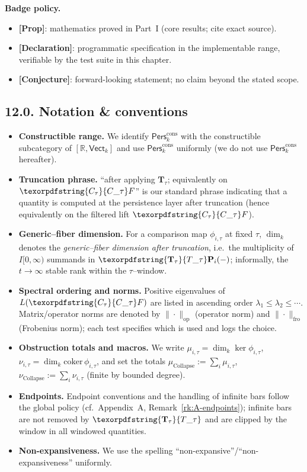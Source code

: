 \documentclass[11pt]{article}
\numberwithin{equation}{section}
\theoremstyle{plain}
\theoremstyle{definition}
\theoremstyle{remark}
\DeclareRobustCommand{\hyp}{\nobreakdash-}
\newcommand{\Pers}{\mathsf{Pers}}
\theoremstyle{plain}
\theoremstyle{definition}
\numberwithin{equation}{section}
\theoremstyle{definition}
\DeclareRobustCommand{\Perskft}{\Pers^{\mathrm{cons}}_{k}}
\DeclareRobustCommand{\Ttau}{\texorpdfstring{\ensuremath{\mathbf{T}_{\tau}}}{T\_\tau}}
\DeclareRobustCommand{\Ctau}{\texorpdfstring{\ensuremath{C_{\tau}}}{C\_\tau}}
\DeclareRobustCommand{\muc}{\mu_{\mathrm{Collapse}}}
\DeclareRobustCommand{\nuc}{\nu_{\mathrm{Collapse}}}
\numberwithin{equation}{section}
\theoremstyle{plain}
\theoremstyle{definition}
\theoremstyle{remark}
\providecommand{\Cfun}[1]{\mathsf{C}_{#1}}
\providecommand{\Tfun}[1]{\mathbf{T}_{#1}}
\providecommand{\Ctau}{\Cfun{\tau}}
\providecommand{\Ttau}{\Tfun{\tau}}
\providecommand{\muc}{\mu_{\mathrm{Collapse}}}
\providecommand{\nuc}{\nu_{\mathrm{Collapse}}}
\begin{document}
\noindent\textbf{Badge policy.}
\begin{itemize}
  \item \textbf{[Prop]}: mathematics proved in Part~I (core results; cite exact source).
  \item \textbf{[Declaration]}: programmatic specification in the implementable range, verifiable by the test suite in this chapter.
  \item \textbf{[Conjecture]}: forward-looking statement; no claim beyond the stated scope.
\end{itemize}

\subsection*{12.0. Notation \& conventions}
\begin{itemize}
  \item \textbf{Constructible range.} We identify \(\Perskft\) with the constructible subcategory of \([\mathbb{R},\mathsf{Vect}_k]\) and use \(\Perskft\) uniformly (we do not use \(\Pers^{\mathrm{cons}}_k\) hereafter).
  \item \textbf{Truncation phrase.} “after applying \(\mathbf{T}_\tau\); equivalently on \(\Ctau F\)” is our standard phrase indicating that a quantity is computed at the persistence layer after truncation (hence equivalently on the filtered lift \(\Ctau F\)).
  \item \textbf{Generic–fiber dimension.} For a comparison map \(\phi_{i,\tau}\) at fixed \(\tau\), \(\dim_k\) denotes the \emph{generic–fiber dimension after truncation}, i.e.\ the multiplicity of \(I[0,\infty)\) summands in \(\Ttau\mathbf{P}_i(-)\); informally, the \(t\to\infty\) stable rank within the \(\tau\)–window.
  \item \textbf{Spectral ordering and norms.} Positive eigenvalues of \(L(\Ctau F)\) are listed in ascending order \(\lambda_1\le \lambda_2\le\cdots\). Matrix/operator norms are denoted by \(\|\cdot\|_{\mathrm{op}}\) (operator norm) and \(\|\cdot\|_{\mathrm{fro}}\) (Frobenius norm); each test specifies which is used and logs the choice.
  \item \textbf{Obstruction totals and macros.} We write \(\mu_{i,\tau}=\dim_k\ker\phi_{i,\tau}\), \(\nu_{i,\tau}=\dim_k\mathrm{coker}\,\phi_{i,\tau}\), and set the totals \(\muc:=\sum_i\mu_{i,\tau}\), \(\nuc:=\sum_i\nu_{i,\tau}\) (finite by bounded degree).
  \item \textbf{Endpoints.} Endpoint conventions and the handling of infinite bars follow the global policy (cf.\ Appendix~A, Remark~\ref{rk:A-endpoints}); infinite bars are not removed by \(\Ttau\) and are clipped by the window in all windowed quantities.
  \item \textbf{Non\hyp expansiveness.} We use the spelling “non\hyp expansive”/“non\hyp expansiveness” uniformly.
\end{itemize}
\end{document}
